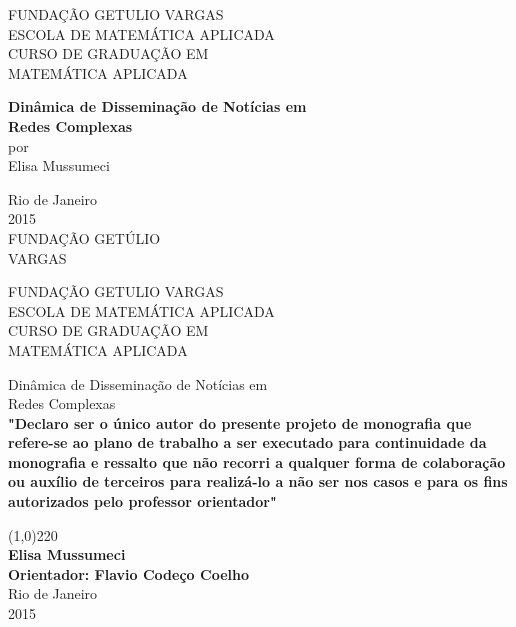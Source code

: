 \documentclass[a4paper,12pt]{article}
\begin{document}
\begin{titlepage}
 \begin{center}
  { \large FUNDAÇÃO GETULIO VARGAS}\\[0.3cm]
  { \large ESCOLA DE MATEMÁTICA APLICADA}\\[0.5cm]
  { \large CURSO DE GRADUAÇÃO EM}\\[0.3cm]
  { \large MATEMÁTICA APLICADA}\\[0.3cm]
 
  \vspace{55 mm}

  {\bf \large Dinâmica de Disseminação de Notícias em}\\[0.1cm]
  {\bf \large Redes Complexas}\\[1.7cm]

  { por}\\[0.6cm]
  {\large Elisa Mussumeci}\\[0.1cm]


  \vspace{7cm}

  { Rio de Janeiro}\\[0.1cm]
  { 2015}\\[0.6cm]
  { FUNDAÇÃO GETÚLIO}\\[0.1cm]
  { VARGAS}\\[0.1cm]
 \end{center}
\end{titlepage}

\begin{titlepage}
 
 \begin{center}
  {\large FUNDAÇÃO GETULIO VARGAS}\\[0.3cm]
  {\large ESCOLA DE MATEMÁTICA APLICADA}\\[0.5cm]
  {\large CURSO DE GRADUAÇÃO EM}\\[0.3cm]
  {\large MATEMÁTICA APLICADA}\\[0.3cm]


  \vspace{20 mm}


  {\large Dinâmica de Disseminação de Notícias em}\\[0.1cm]
  {\large Redes Complexas}\\[2.5cm]

  
  \bf "Declaro ser o único autor do presente projeto de monografia que refere-se ao
plano de trabalho a ser executado para continuidade da monografia e ressalto
que não recorri a qualquer forma de colaboração ou auxílio de terceiros para
realizá-lo a não ser nos casos e para os fins autorizados pelo professor orientador"

  \vspace{3.5cm}


  \line(1,0){220}\\[0.1cm]
  {\bf Elisa Mussumeci}\\[2cm]
  {\bf Orientador: Flavio Codeço Coelho}\\[5cm]




  {Rio de Janeiro}\\[0.1cm]
  {2015}
 \end{center}
\end{titlepage}
\end{document}

